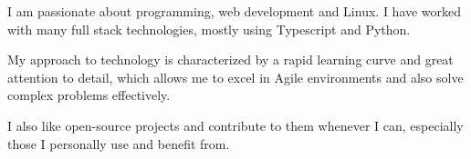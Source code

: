 

\begin{cvparagraph}

I am passionate about programming, web development
and Linux.
I have worked with many full stack technologies, mostly using
Typescript and Python.
\end{cvparagraph}

\begin{cvparagraph}
My approach to technology is characterized by a rapid learning curve and great attention to detail, which allows me to excel in Agile environments and also solve complex problems effectively.
\end{cvparagraph}

\begin{cvparagraph}

I also like open-source projects and contribute to them whenever I can, especially those I personally use and benefit from.


\end{cvparagraph}